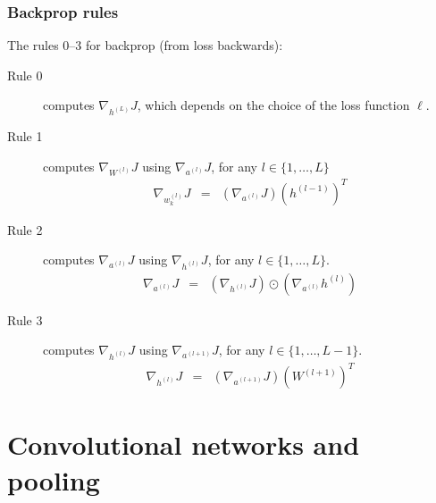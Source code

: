 \documentclass{beamer}
\begin{document}
\begin{frame}
  \frametitle{Backprop rules}
  The rules 0--3 for backprop (from loss backwards):
\begin{description}
\item[Rule 0] computes $\nabla_{h^{(L)}} J$, which depends on the
  choice of the loss function $\ell$.
\item[Rule 1] computes
  $\nabla_{W^{(l)}} J$ using $\nabla_{a^{(l)}} J$, for any $l\in\{1,\dots,L\}$
\begin{eqnarray}
  \nabla_{w_k^{(l)}} J
  &=& \left(\nabla_{a^{(l)}} J\right)
      \left( h^{(l-1)} \right)^T \label{eq:grad-loss-w}
\end{eqnarray}
\item[Rule 2] computes
  $\nabla_{a^{(l)}} J$ using $\nabla_{h^{(l)}} J$, for any $l\in\{1,\dots,L\}$.
\begin{eqnarray}
  \nabla_{a^{(l)}} J
  &=& \left(\nabla_{h^{(l)}} J\right) \odot
      \label{eq:grad-loss-a}
      \left(\nabla_{a^{(l)}} h^{(l)} \right) 
\end{eqnarray}
\item[Rule 3] computes
  $\nabla_{h^{(l)}} J$ using $\nabla_{a^{(l+1)}} J$, for any $l\in\{1,\dots,L-1\}$.
\begin{eqnarray}
  \nabla_{h^{(l)}} J
  &=& \left(\nabla_{a^{(l+1)}} J\right)
      \left(W^{(l+1)}\right)^T \label{eq:grad-loss-h}
\end{eqnarray}
\end{description}

\end{frame}

\section{Convolutional networks and pooling}
\end{document}
